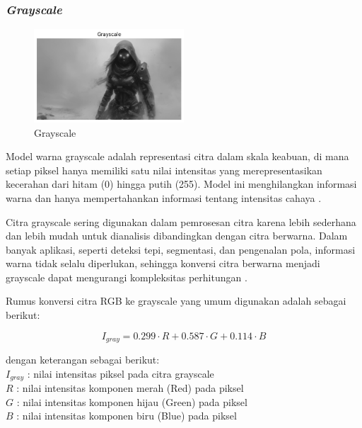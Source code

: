 \subsubsection{\textit{Grayscale}} \label{II.Grayscale}
\begin{figure}[H]
	\centering
	\includegraphics[width=0.5\textwidth]{figure/chapter-2-Grayscale.png}
	\caption{Grayscale}
	\label{fig:2.Grayscale}
\end{figure}

Model warna grayscale adalah representasi citra dalam skala keabuan, di mana setiap piksel hanya memiliki satu nilai intensitas yang merepresentasikan kecerahan dari hitam (0) hingga putih (255). Model ini menghilangkan informasi warna dan hanya mempertahankan informasi tentang intensitas cahaya \cite{marpaung2022computer}.

Citra grayscale sering digunakan dalam pemrosesan citra karena lebih sederhana dan lebih mudah untuk dianalisis dibandingkan dengan citra berwarna. Dalam banyak aplikasi, seperti deteksi tepi, segmentasi, dan pengenalan pola, informasi warna tidak selalu diperlukan, sehingga konversi citra berwarna menjadi grayscale dapat mengurangi kompleksitas perhitungan \cite{marpaung2022computer}.

Rumus konversi citra RGB ke grayscale yang umum digunakan adalah sebagai berikut:

\begin{equation}
I_{gray} = 0.299 \cdot R + 0.587 \cdot G + 0.114 \cdot B
\label{eq:grayscale}
\end{equation}

\noindent
dengan keterangan sebagai berikut:\\[0.5em]
\hspace*{1.5em}$I_{gray}$ : nilai intensitas piksel pada citra grayscale\\
\hspace*{1.5em}$R$ : nilai intensitas komponen merah (Red) pada piksel\\
\hspace*{1.5em}$G$ : nilai intensitas komponen hijau (Green) pada piksel\\
\hspace*{1.5em}$B$ : nilai intensitas komponen biru (Blue) pada piksel

